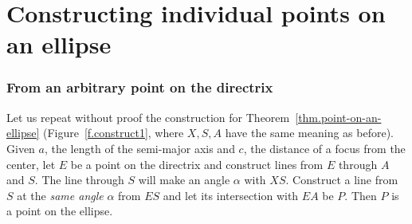 
\section{Constructing individual points on an ellipse}\label{s.individual}

\subsubsection*{From an arbitrary point on the directrix}

Let us repeat without proof the construction for Theorem~\ref{thm.point-on-an-ellipse} (Figure~\ref{f.construct1}, where $X,S,A$ have the same meaning as before). Given $a$, the length of the semi-major axis and $c$, the distance of a focus from the center, let $E$ be a point on the directrix and construct lines from $E$ through $A$ and $S$. The line through $S$ will make an angle $\alpha$ with $XS$. Construct a line from $S$ at the \emph{same angle} $\alpha$ from $ES$ and let its intersection with $EA$ be $P$. Then $P$ is a point on the ellipse. 


